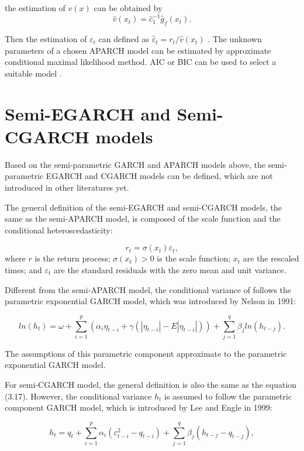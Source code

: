 the estimation of $v(x)$ can be obtained by
\[\hat{v}(x_t)=\hat{c}_1^{-1}\hat{g}_f(x_t).\]

Then the estimation of $\varepsilon_t$ can defined as $\hat{\varepsilon}_t=r_t/\hat{v}(x_t)$ . The unknown parameters of a chosen APARCH model can be estimated by approximate conditional maximal likelihood method. AIC or BIC can be used to select a suitable model \citep{FengYuanhua;Sun2013}.

\section{Semi-EGARCH and Semi-CGARCH models}
Based on the semi-parametric GARCH and APARCH models above, the semi-parametric EGARCH and CGARCH models can be defined, which are not introduced in other literatures yet.

The general definition of the semi-EGARCH and semi-CGARCH models, the same as the semi-APARCH model, is composed of the scale function and the conditional heteroscedasticity:

\begin{equation}
r_{t} = \sigma(x_{t})\varepsilon_{t},
\end{equation}
where $r$ is the return process; $\sigma(x_{t})>0$ is the scale function; $x_{t}$ are the rescaled times; and $\varepsilon_{t}$ are the standard residuals with the zero mean and unit variance. 

Different from the semi-APARCH model, the conditional variance of  follows the parametric exponential GARCH model, which was introduced by Nelson in 1991:

\begin{equation}
ln(h_t) =\omega + \sum_{i=1}^p(\alpha_i\eta_{t-i}+\gamma(|\eta_{t-i}|-E|\eta_{t-i}|))+\sum_{j=1}^q\beta_jln(h_{t-j}).
\end{equation}

The assumptions of this parametric component approximate to the parametric exponential GARCH model.

For semi-CGARCH model, the general definition is also the same as the equation (3.17). However, the conditional variance $h_t$ is assumed to follow the parametric component GARCH model, which is introduced by Lee and Engle in 1999:

\begin{equation}
h_{t}=q_{t}+\sum_{i=1}^{p}\alpha_{i}(\varepsilon_{t-i}^{2}-q_{t-i}) + \sum_{j=1}^{q}\beta_{j}(h_{t-j}-q_{t-j}),
\end{equation}

